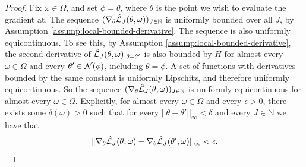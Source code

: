 \documentclass{article}
\begin{document}
\begin{proof}


    
    Fix $\omega \in \Omega$, and set $\phi = \theta$, where $\theta$ is the point we wish to evaluate the gradient at. The sequence $(\nabla_\theta \hat{\mathcal{L}}_J(\theta, \omega))_{J \in \mathbb{N}}$ is uniformly bounded over all $J$, by Assumption \ref{assump:local-bounded-derivative}. The sequence is also uniformly equicontinuous. To see this, by Assumption \ref{assump:local-bounded-derivative}, the second derivative of $\hat{\mathcal{L}}_J(\theta, \omega)|_{\theta=\theta'}$ is also bounded by $H$ for almost every $\omega\in \Omega$ and every $\theta' \in {\mathcal{N}}(\phi)$, including $\theta=\phi$. A set of functions with derivatives bounded by the same constant is uniformly Lipschitz, and therefore uniformly equicontinuous. So the sequence $(\nabla_\theta \hat{\mathcal{L}}_J(\theta, \omega))_{J \in \mathbb{N}}$ is uniformly equicontinuous for almost every $\omega \in \Omega$. 
    Explicitly, for almost every $\omega \in \Omega$ and every $\epsilon>0$, there exists some $\delta(\omega)>0$ such that for every $||\theta - \theta'||_{\infty}<\delta$ and every $J \in \mathbb{N}$ we have that
    $$||\nabla_\theta \hat{\mathcal{L}}_J(\theta, \omega)-\nabla_\theta \hat{\mathcal{L}}_J(\theta', \omega)||_\infty < \epsilon.$$



\end{proof}
\end{document}
